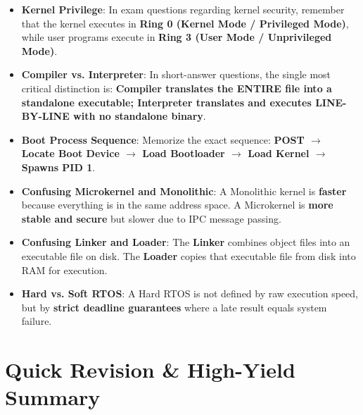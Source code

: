 \begin{examtip}
\begin{itemize}
    \item \textbf{Kernel Privilege}: In exam questions regarding kernel security, remember that the kernel executes in \textbf{Ring 0 (Kernel Mode / Privileged Mode)}, while user programs execute in \textbf{Ring 3 (User Mode / Unprivileged Mode)}.
    \item \textbf{Compiler vs. Interpreter}: In short-answer questions, the single most critical distinction is: \textbf{Compiler translates the ENTIRE file into a standalone executable; Interpreter translates and executes LINE-BY-LINE with no standalone binary}.
    \item \textbf{Boot Process Sequence}: Memorize the exact sequence: \textbf{POST $\rightarrow$ Locate Boot Device $\rightarrow$ Load Bootloader $\rightarrow$ Load Kernel $\rightarrow$ Spawns PID 1}.
\end{itemize}
\end{examtip}

\begin{commonmistake}
\begin{itemize}
    \item \textbf{Confusing Microkernel and Monolithic}: A Monolithic kernel is \textbf{faster} because everything is in the same address space. A Microkernel is \textbf{more stable and secure} but slower due to IPC message passing.
    \item \textbf{Confusing Linker and Loader}: The \textbf{Linker} combines object files into an executable file on disk. The \textbf{Loader} copies that executable file from disk into RAM for execution.
    \item \textbf{Hard vs. Soft RTOS}: A Hard RTOS is not defined by raw execution speed, but by \textbf{strict deadline guarantees} where a late result equals system failure.
\end{itemize}
\end{commonmistake}

\section{Quick Revision \& High-Yield Summary}


